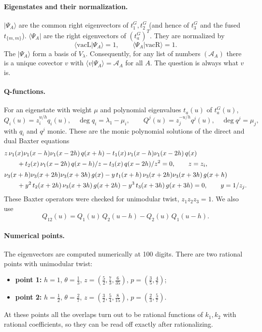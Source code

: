 \documentclass[11pt]{article}
\newcommand{\vacL}{\langle\mathrm{vacL}|}
\newcommand{\vacR}{|\mathrm{vacR}\rangle}
\theoremstyle{definition}
\theoremstyle{remark}
\begin{document}
\paragraph{Eigenstates and their normalization.}
$|\Psi_A\rangle$ are the common right eigenvectors of $t^G_1,t^G_2$ (and hence of $t^G_3$ and the fused $t_{\{m,m\}}$). $\langle\Psi_A|$ are the right eigenvectors of $(t^G_a)^T$. They are normalized by
\begin{equation}
\vacL\Psi_A\rangle=1,\qquad \langle\Psi_A\vacR=1 .
\end{equation}
The $|\Psi_A\rangle$ form a basis of $V_\lambda$. Consequently, for any list of numbers $(\mathcal A_A)$ there is a unique covector $v$ with $\langle v|\Psi_A\rangle=\mathcal A_A$ for all $A$. The question is always what $v$ is.

\paragraph{Q-functions.}
For an eigenstate with weight $\mu$ and polynomial eigenvalues $t_a(u)$ of $t^G_a(u)$,
\begin{equation}
Q_i(u)=z_i^{u/h}q_i(u),\quad \deg q_i=\lambda_1-\mu_i,\qquad Q^j(u)=z_j^{-u/h}q^j(u),\quad \deg q^j=\mu_j,
\end{equation}
with $q_i$ and $q^j$ monic. These are the monic polynomial solutions of the direct and dual Baxter equations
\begin{align}
&z\,\nu_1(x)\nu_1(x-h)\nu_1(x-2h)\,q(x+h)-t_1(x)\,\nu_1(x-h)\nu_1(x-2h)\,q(x)\notag\\
&\qquad+t_2(x)\,\nu_1(x-2h)\,q(x-h)/z-t_3(x)\,q(x-2h)/z^2=0,\qquad z=z_i,\\[2pt]
&\nu_3(x+h)\nu_3(x+2h)\nu_3(x+3h)\,g(x)-y\,t_1(x+h)\,\nu_3(x+2h)\nu_3(x+3h)\,g(x+h)\notag\\
&\qquad+y^2\,t_2(x+2h)\,\nu_3(x+3h)\,g(x+2h)-y^3\,t_3(x+3h)\,g(x+3h)=0,\qquad y=1/z_j .
\end{align}
These Baxter operators were checked for unimodular twist, $z_1z_2z_3=1$. We also use
\begin{equation}
Q_{12}(u)=Q_1(u)\,Q_2(u-h)-Q_2(u)\,Q_1(u-h).
\end{equation}

\paragraph{Numerical points.}
The eigenvectors are computed numerically at 100 digits. There are two rational points with unimodular twist:
\begin{itemize}
\item \textbf{point 1:} $h=1$, $\theta=\tfrac13$, $z=(\tfrac52,\tfrac73,\tfrac6{35})$, $p=(\tfrac35,\tfrac47)$;
\item \textbf{point 2:} $h=\tfrac12$, $\theta=\tfrac27$, $z=(\tfrac32,\tfrac54,\tfrac8{15})$, $p=(\tfrac23,\tfrac57)$.
\end{itemize}
At these points all the overlaps turn out to be rational functions of $k_1,k_2$ with rational coefficients, so they can be read off exactly after rationalizing.
\end{document}
